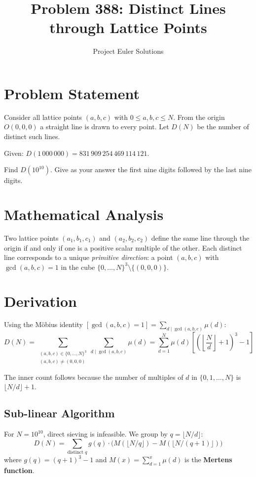 \documentclass[11pt]{article}
\title{Problem 388: Distinct Lines through Lattice Points}
\author{Project Euler Solutions}
\date{}
\begin{document}
\maketitle

\section{Problem Statement}
Consider all lattice points $(a,b,c)$ with $0 \le a, b, c \le N$. From the origin $O(0,0,0)$ a straight line is drawn to every point. Let $D(N)$ be the number of distinct such lines.

Given: $D(1\,000\,000) = 831\,909\,254\,469\,114\,121$.

Find $D(10^{10})$. Give as your answer the first nine digits followed by the last nine digits.

\section{Mathematical Analysis}
Two lattice points $(a_1,b_1,c_1)$ and $(a_2,b_2,c_2)$ define the same line through the origin if and only if one is a positive scalar multiple of the other. Each distinct line corresponds to a unique \emph{primitive direction}: a point $(a,b,c)$ with $\gcd(a,b,c) = 1$ in the cube $\{0,\ldots,N\}^3 \setminus \{(0,0,0)\}$.

\section{Derivation}
Using the M\"obius identity $[\gcd(a,b,c) = 1] = \sum_{d \mid \gcd(a,b,c)} \mu(d)$:
\[
D(N) = \sum_{\substack{(a,b,c) \in \{0,\ldots,N\}^3 \\ (a,b,c) \neq (0,0,0)}} \sum_{d \mid \gcd(a,b,c)} \mu(d)
= \sum_{d=1}^{N} \mu(d) \left[\left(\left\lfloor \frac{N}{d}\right\rfloor + 1\right)^3 - 1\right]
\]

The inner count follows because the number of multiples of $d$ in $\{0,1,\ldots,N\}$ is $\lfloor N/d \rfloor + 1$.

\subsection{Sub-linear Algorithm}
For $N = 10^{10}$, direct sieving is infeasible. We group by $q = \lfloor N/d \rfloor$:
\[
D(N) = \sum_{\text{distinct } q} g(q) \cdot \bigl(M(\lfloor N/q \rfloor) - M(\lfloor N/(q+1) \rfloor)\bigr)
\]
where $g(q) = (q+1)^3 - 1$ and $M(x) = \sum_{d=1}^{x} \mu(d)$ is the \textbf{Mertens function}.
\end{document}
